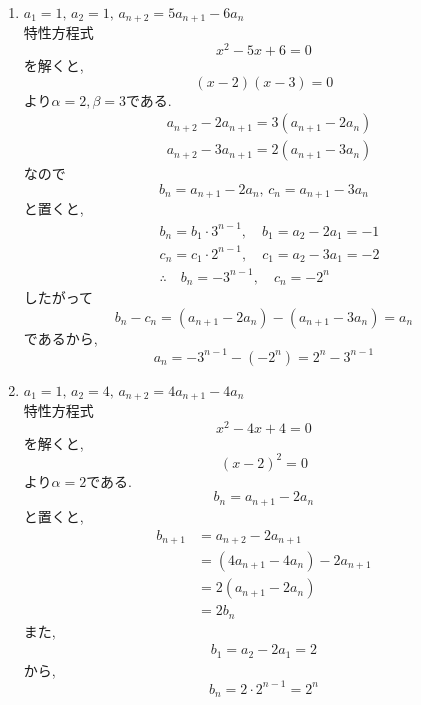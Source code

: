     \noindent{}
    \begin{enumerate}[label=(\arabic*),parsep=3pt,format=\bookitemlink{example-three-term-1}{solution}{problem}]
      \item $\displaystyle a_1=1,\,a_2=1,\, a_{n+2}=5a_{n+1}-6a_n$\\
            特性方程式
            \[
              x^2-5x+6=0
            \]
            を解くと,
            \[
              (x-2)(x-3)=0
            \]
            より$\alpha=2,\beta=3$である.
            \begin{align*}
              &a_{n+2}-2a_{n+1}=3(a_{n+1}-2a_n)\\
              &a_{n+2}-3a_{n+1}=2(a_{n+1}-3a_n)
            \end{align*}
            なので
            \[
              b_n=a_{n+1}-2a_n,\,c_n=a_{n+1}-3a_n
            \]
            と置くと,
            \begin{align*}
              &b_n=b_1\cdot3^{n-1},\quad b_1=a_2-2a_1=-1\\
              &c_n=c_1\cdot2^{n-1},\quad c_1=a_2-3a_1=-2\\
              &\therefore \quad b_n=-3^{n-1},\quad c_n=-2^n
            \end{align*}
            したがって
            \[
              b_n-c_n=(a_{n+1}-2a_n)-(a_{n+1}-3a_n)=a_n
            \]
            であるから,
            \[
              a_n=-3^{n-1}-(-2^n)=2^n-3^{n-1}
            \]
      \item $\displaystyle a_1=1,\,a_2=4,\, a_{n+2}=4a_{n+1}-4a_n$\\
            特性方程式
            \[
              x^2-4x+4=0
            \]
            を解くと,
            \[
              (x-2)^2=0
            \]
            より$\alpha=2$である.
            \[
              b_n=a_{n+1}-2a_n
            \]
            と置くと,
            \begin{align*}
              b_{n+1}&=a_{n+2}-2a_{n+1}\\
              &=(4a_{n+1}-4a_n)-2a_{n+1}\\
              &=2(a_{n+1}-2a_n)\\
              &=2b_n
            \end{align*}
            また,
            \begin{align*}
              b_1=a_2-2a_1=2
            \end{align*}
            から,
            \[
              b_n=2\cdot2^{n-1}=2^n
\]
\end{enumerate}
